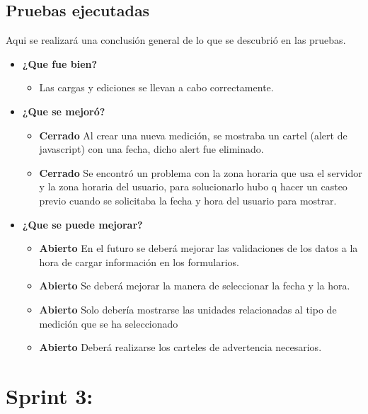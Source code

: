 \documentclass[a4paper,12pt]{article}
\begin{document}
\subsection{Pruebas ejecutadas}
Aqui se realizará una conclusión general de lo que se descubrió en las pruebas.
	\begin{itemize}
		\item \textbf{¿Que fue bien?}
        	\begin{itemize}
				\item        Las cargas y ediciones se llevan a cabo correctamente.
			\end{itemize}

   		\item \textbf{¿Que se mejoró?}
        	\begin{itemize}
				\item \textbf{Cerrado} Al crear una nueva medición, se mostraba un cartel (alert de javascript) con una fecha, dicho alert fue eliminado.
                \item \textbf{Cerrado} Se encontró un problema con la zona horaria que usa el servidor y la zona horaria del usuario, para solucionarlo hubo q hacer un casteo previo cuando se solicitaba la fecha y hora del usuario para mostrar.
			\end{itemize}

   		\item \textbf{¿Que se puede mejorar?}
        	\begin{itemize}
		        \item \textbf{Abierto} En el futuro se deberá mejorar las validaciones de los datos a la hora de cargar información en los formularios.
        		\item \textbf{Abierto} Se deberá mejorar la manera de seleccionar la fecha y la hora.
		        \item \textbf{Abierto} Solo debería mostrarse las unidades relacionadas al tipo de medición que se ha seleccionado  
                \item \textbf{Abierto} Deberá realizarse los carteles de advertencia necesarios.
            \end{itemize}
        

	\end{itemize}



\section{Sprint 3: }%
\end{document}
